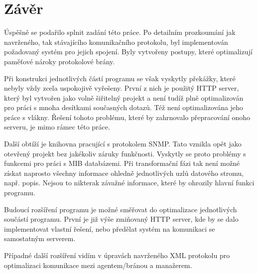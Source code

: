 \chapter{Závěr}
\label{kap_zaver}
Úspěšně se podařilo splnit zadání této práce. Po detailním prozkoumání jak navrženého, tak stávajícího komunikačního protokolu, byl
implementován požadovaný systém pro jejich spojení. Byly vytvořeny postupy, které optimalizují paměťové nároky protokolové brány.

Při konstrukci jednotlivých částí programu se však vyskytly překážky, které nebyly vždy zcela uspokojivě vyřešeny. První z nich je
použitý HTTP server, který byl vytvořen jako volně šiřitelný projekt a není tudíž plně optimalizován pro práci s mnoha desítkami
současných dotazů. Též není optimalizována jeho práce s vlákny. Řešení tohoto problému, které by zahrnovalo přepracování onoho
serveru, je mimo rámec této práce.

Další obtíží je knihovna pracující s protokolem SNMP. Tato vznikla opět jako otevřený projekt bez jakékoliv záruky funkčnosti.
Vyskytly se proto problémy s funkcemi pro práci s MIB databázemi. Při transformační fázi tak není možné získat naprosto všechny 
informace ohledně jednotlivých uzlů datového stromu, např. popis. Nejsou to nikterak závažné informace, které by ohrozily
hlavní funkci programu.

Budoucí rozšíření programu je možné směřovat do optimalizace jednotlivých součástí programu. První je již výše zmiňovaný HTTP server,
kde by se dalo implementovat vlastní řešení, nebo předělat systém na komunikaci se samostatným serverem.

Případné další rozšíření vidím v úpravách navrženého XML protokolu pro optimalizaci komunikace mezi agentem/bránou a manažerem.



